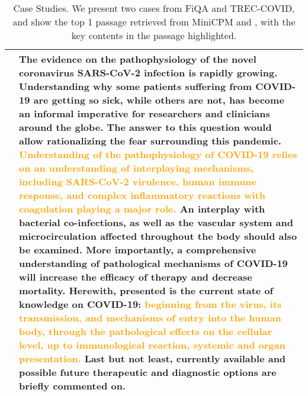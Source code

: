 \begin{table*}[t]
\begin{tabular}{lp{12.5cm}}
\hline
\textbf{\method{}}&The evidence on the pathophysiology of the novel coronavirus SARS-CoV-2 infection is rapidly growing. Understanding why some patients suffering from COVID-19 are getting so sick, while others are not, has become an informal imperative for researchers and clinicians around the globe. The answer to this question would allow rationalizing the fear surrounding this pandemic. \textcolor{orange}{Understanding of the pathophysiology of COVID-19 relies on an understanding of interplaying mechanisms, including SARS-CoV-2 \textcolor{orange}{virulence}, human immune response, and complex inflammatory reactions with coagulation playing a major role.} An interplay with bacterial co-infections, as well as the vascular system and microcirculation affected throughout the body should also be examined. More importantly, a comprehensive understanding of pathological mechanisms of COVID-19 will increase the efficacy of therapy and decrease mortality. Herewith, presented is the current state of knowledge on COVID-19: \textcolor{orange}{beginning from the virus, its transmission, and mechanisms of entry into the human body, through the pathological effects on the cellular level, up to immunological reaction, systemic and organ presentation.} Last but not least, currently available and possible future therapeutic and diagnostic options are briefly commented on.\\
\hline
\end{tabular}
\caption{Case Studies. We present two cases from FiQA and TREC-COVID, and show the top 1 passage retrieved from MiniCPM and \method{}, with the key contents in the passage highlighted.}
\label{tab:case_study}
\end{table*}